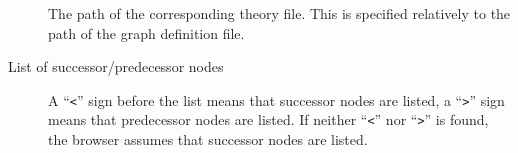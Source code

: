 \begin{isabellebody}
\begin{isamarkuptext}
\begin{description}
  \item[] The path of the corresponding theory file. This
  is specified relatively to the path of the graph definition file.

  \item[List of successor/predecessor nodes] A ``\verb|<|''
  sign before the list means that successor nodes are listed, a
  ``\verb|>|'' sign means that predecessor nodes are listed. If
  neither ``\verb|<|'' nor ``\verb|>|'' is found, the
  browser assumes that successor nodes are listed.

  \end{description}%
\end{isamarkuptext}%
\isamarkuptrue%
%
\isadelimtheory
%
\endisadelimtheory
%
\isatagtheory
{}\isamarkupfalse%
%
\endisatagtheory
{\isafoldtheory}%
%
\isadelimtheory
%
\endisadelimtheory
\end{isabellebody}%
